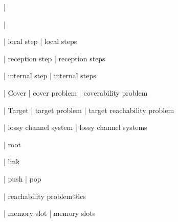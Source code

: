 | \memoryproj

| \memoryproj

| local step
| local steps

| reception step
| reception steps

| internal step
| internal steps


| Cover
| cover problem
| coverability problem

| Target
| target problem
| target reachability problem


| lossy channel system
| lossy channel systems

| root

| link

| push
| pop

| reachability problem@lcs


| memory slot
| memory slots